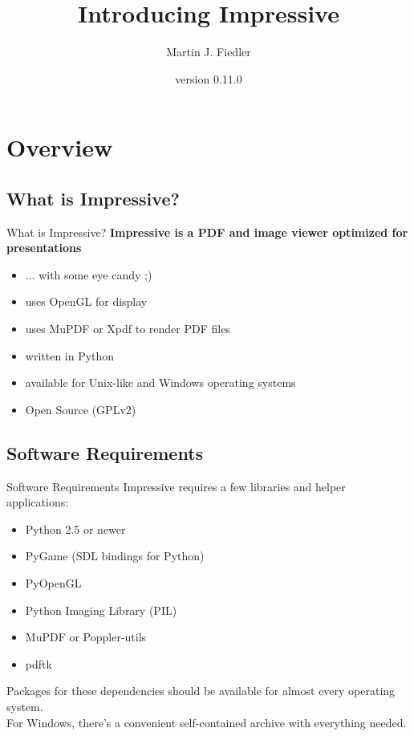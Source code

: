\documentclass[bigger,hyperref={colorlinks=true,linkcolor=white,urlcolor=blue}]{beamer}
\title{Introducing Impressive}
\author{Martin J. Fiedler}
\date{version 0.11.0}
\begin{document}
\maketitle


\section{Overview}

\subsection{What is Impressive?}
\begin{frame}{What is Impressive?}
    \large
    \textbf{Impressive is a PDF and image viewer optimized for presentations}
    \normalsize
    \begin{itemize}
        \item ... with some eye candy ;)
        \item uses OpenGL for display
        \item uses MuPDF or Xpdf to render PDF files
        \item written in Python
        \item available for Unix-like and Windows operating systems
        \item Open Source (GPLv2)
    \end{itemize}
\end{frame}

\subsection{Software Requirements}
\begin{frame}{Software Requirements}
    Impressive requires a few libraries and helper applications:
    \begin{itemize}
        \item Python 2.5 or newer
        \item PyGame (SDL bindings for Python)
        \item PyOpenGL
        \item Python Imaging Library (PIL)
        \item MuPDF or Poppler-utils
        \item pdftk
    \end{itemize}
    Packages for these dependencies should be available for almost every
    operating system. \\
    For Windows, there's a convenient self-contained archive with
    everything needed.
\end{frame}
\end{document}
